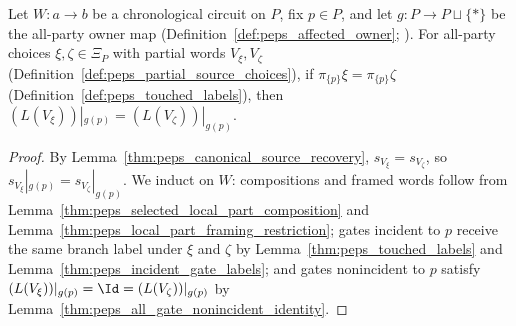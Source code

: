 \begin{lemma}
    \label{thm:peps_all_branch_incident_locality}
    \leanok
    Let $W:a\to b$ be a chronological circuit on $P$, fix $p\in P$, and let
    $g:P\to P\sqcup\{*\}$ be the all-party owner map
    (Definition~\ref{def:peps_affected_owner};
    \cite[proof of Theorem~5.2]{OpenAI2026PolynomialPEPS}). For all-party
    choices $\xi,\zeta\in\Xi_P$ with partial words $V_\xi,V_\zeta$
    (Definition~\ref{def:peps_partial_source_choices}), if
    $\pi_{\{p\}}\xi=\pi_{\{p\}}\zeta$ (Definition~\ref{def:peps_touched_labels}),
    then $(L(V_\xi))|_{g(p)}=(L(V_\zeta))|_{g(p)}$.
\end{lemma}

\begin{proof}\leanok
    By Lemma~\ref{thm:peps_canonical_source_recovery}, $s_{V_\xi}=s_{V_\zeta}$,
    so $s_{V_\xi}|_{g(p)}=s_{V_\zeta}|_{g(p)}$. We induct on $W$: compositions
    and framed words follow from Lemma~\ref{thm:peps_selected_local_part_composition}
    and Lemma~\ref{thm:peps_local_part_framing_restriction}; gates incident to
    $p$ receive the same branch label under $\xi$ and $\zeta$ by
    Lemma~\ref{thm:peps_touched_labels} and Lemma~\ref{thm:peps_incident_gate_labels};
    and gates nonincident to $p$ satisfy
    $(L(V_\xi))|_{g(p)}=\Id=(L(V_\zeta))|_{g(p)}$ by
    Lemma~\ref{thm:peps_all_gate_nonincident_identity}.
\end{proof}


